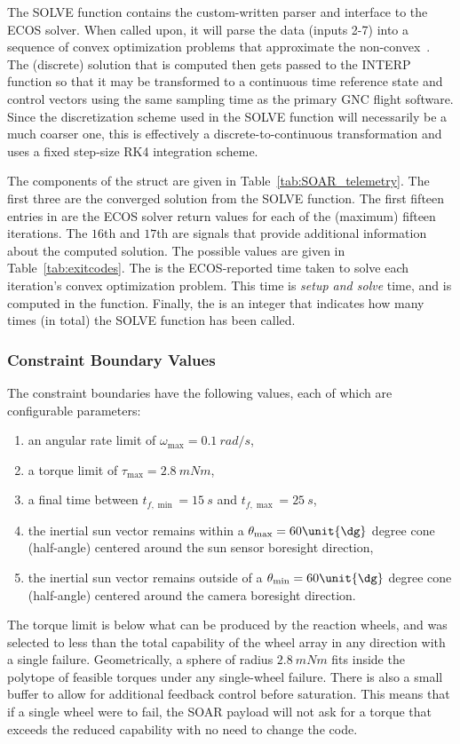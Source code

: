 \documentclass[10pt]{article}
\begin{document}
The SOLVE function contains the custom-written parser and interface to the ECOS solver. When called upon, it will parse the data (inputs 2-7) into a sequence of convex optimization problems that approximate the non-convex~. The (discrete) solution that is computed then gets passed to the INTERP function so that it may be transformed to a continuous time reference state and control vectors using the same sampling time as the primary GNC flight software. Since the discretization scheme used in the SOLVE function will necessarily be a much coarser one, this is effectively a discrete-to-continuous transformation and uses a fixed step-size RK4 integration scheme. 

The components of the  struct are given in Table~\ref{tab:SOAR_telemetry}. The first three are the converged solution from the SOLVE function. The first fifteen entries in  are the ECOS solver return values for each of the (maximum) fifteen iterations. The $16$th and $17$th are signals that provide additional information about the computed solution. The possible values are given in Table~\ref{tab:exitcodes}. The  is the ECOS-reported time taken to solve each iteration's convex optimization problem. This time is \textit{setup and solve} time, and is computed in the  function. Finally, the  is an integer that indicates how many times (in total) the SOLVE function has been called.

\subsubsection{Constraint Boundary Values}

The constraint boundaries have the following values, each of which are configurable parameters:
\begin{enumerate}
\item an angular rate limit of $\omega_{\max} = 0.1~\unit{rad/s}$,
\item a torque limit of $\tau_{\max} = 2.8~\unit{mNm}$,
\item a final time between $t_{f,\min}=15~\unit{s}$ and $t_{f,\max}=25~\unit{s}$,
\item the inertial sun vector remains within a $\theta_{\max}=60\unit{\dg}$ degree cone (half-angle) centered around the sun sensor boresight direction,
\item the inertial sun vector remains outside of a $\theta_{\min}=60\unit{\dg}$ degree cone (half-angle) centered around the camera boresight direction. 
\end{enumerate} 
The torque limit is below what can be produced by the reaction wheels, and was selected to less than the total capability of the wheel array in any direction with a single failure. Geometrically, a sphere of radius $2.8~\unit{mNm}$ fits inside the polytope of feasible torques under any single-wheel failure. There is also a small buffer to allow for additional feedback control before saturation. This means that if a single wheel were to fail, the SOAR payload will not ask for a torque that exceeds the reduced capability with no need to change the code.
\end{document}
